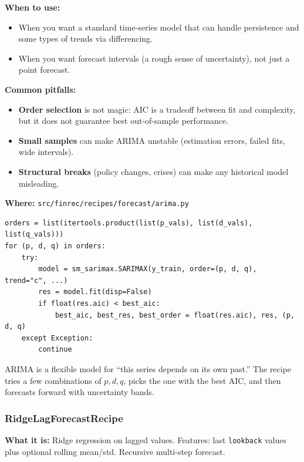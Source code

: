 \documentclass[11pt,a4paper]{article}
\begin{document}
\textbf{When to use:}
\begin{itemize}[leftmargin=2em]
  \item When you want a standard time-series model that can handle persistence and some types of trends via differencing.
  \item When you want forecast intervals (a rough sense of uncertainty), not just a point forecast.
\end{itemize}

\textbf{Common pitfalls:}
\begin{itemize}[leftmargin=2em]
  \item \textbf{Order selection} is not magic: AIC is a tradeoff between fit and complexity, but it does not guarantee best out-of-sample performance.
  \item \textbf{Small samples} can make ARIMA unstable (estimation errors, failed fits, wide intervals).
  \item \textbf{Structural breaks} (policy changes, crises) can make any historical model misleading.
\end{itemize}

\textbf{Where:} \texttt{src/finrec/recipes/forecast/arima.py}

\begin{lstlisting}
orders = list(itertools.product(list(p_vals), list(d_vals), list(q_vals)))
for (p, d, q) in orders:
    try:
        model = sm_sarimax.SARIMAX(y_train, order=(p, d, q), trend="c", ...)
        res = model.fit(disp=False)
        if float(res.aic) < best_aic:
            best_aic, best_res, best_order = float(res.aic), res, (p, d, q)
    except Exception:
        continue
\end{lstlisting}

\begin{intuitionbox}
ARIMA is a flexible model for ``this series depends on its own past.'' The recipe tries a few combinations of \(p,d,q\), picks the one with the best AIC, and then forecasts forward with uncertainty bands.
\end{intuitionbox}

\subsubsection{RidgeLagForecastRecipe}\label{sec:ridge}

\textbf{What it is:} Ridge regression on lagged values. Features: last \texttt{lookback} values plus optional rolling mean/std. Recursive multi-step forecast.
\end{document}
